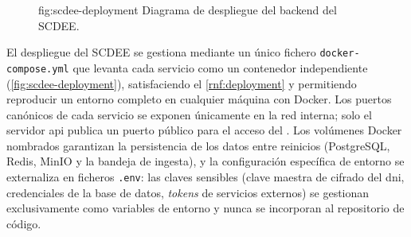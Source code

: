 \begin{figure}[Diagrama de despliegue del SCDEE]%
              {fig:scdee-deployment}%
              {Diagrama de despliegue del backend del SCDEE.}
\end{figure}

El despliegue del SCDEE se gestiona mediante un único fichero
\texttt{docker-compose.yml} que levanta cada servicio como un contenedor
independiente (\cref{fig:scdee-deployment}), satisfaciendo el
\cref{rnf:deployment} y permitiendo reproducir un entorno completo en
cualquier máquina con Docker. Los puertos canónicos de cada servicio se
exponen únicamente en la red interna; solo el servidor \acs{api} publica
un puerto público para el acceso del . Los volúmenes Docker
nombrados garantizan la persistencia de los datos entre reinicios
(PostgreSQL, Redis, MinIO y la bandeja de ingesta), y la configuración
específica de entorno se externaliza en ficheros \texttt{.env}: las claves
sensibles (clave maestra de cifrado del \acs{dni}, credenciales de la base
de datos, \textit{tokens} de servicios externos) se gestionan
exclusivamente como variables de entorno y nunca se incorporan al
repositorio de código.
